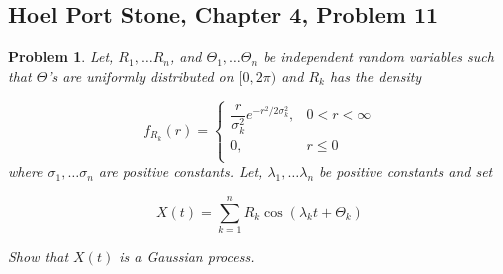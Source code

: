 \documentclass[12pt]{article}
\theoremstyle{problemstyle}
\newtheorem{pbm}{Problem}
\newenvironment{problem}{
\begin{tcolorbox}[colback=green!10!white,colframe=black!75!black, parbox = false]\begin{pbm} }{\end{pbm}\end{tcolorbox} }
\begin{document}
\newpage


\subsection{Hoel Port Stone, Chapter 4, Problem 11}
\begin{problem}
Let, $R_1, \dots R_n$, and $\Theta_1, \dots \Theta_n$ be independent random variables such that $\Theta$'s are uniformly distributed on $[0,2\pi)$ and $R_k$ has the density 

$$
f_{R_k}(r) = \begin{cases}
    \dfrac{r}{\sigma_k^2} e^{-r^2/2\sigma_k^2}, & 0 < r < \infty\\
    0, & r \leq 0\\
\end{cases}
$$
\noindent where $\sigma_1, \dots \sigma_n$ are positive constants. Let, $\lambda_1, \dots \lambda_n$ be positive constants and set 

$$
X(t) = \sum_{k=1}^n R_k \cos(\lambda_k t + \Theta_k)
$$

\noindent Show that $X(t)$ is a Gaussian process.
\end{problem}
\end{document}
